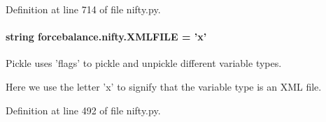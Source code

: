Definition at line 714 of file nifty.\-py.

\hypertarget{namespaceforcebalance_1_1nifty_a338d5080f95188c37271c306f64093d8}{
\paragraph[{X\-M\-L\-F\-I\-L\-E}]{\setlength{\rightskip}{0pt plus 5cm}string forcebalance.\-nifty.\-X\-M\-L\-F\-I\-L\-E = 'x'}}\label{namespaceforcebalance_1_1nifty_a338d5080f95188c37271c306f64093d8}


Pickle uses 'flags' to pickle and unpickle different variable types. 

Here we use the letter 'x' to signify that the variable type is an X\-M\-L file. 

Definition at line 492 of file nifty.\-py.

